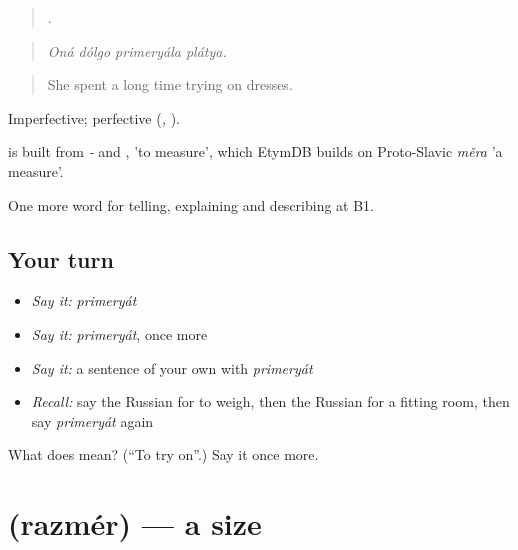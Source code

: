 \begin{quote}
   .
\end{quote}

\begin{quote}
\emph{Oná dólgo primeryála plátya.}
\end{quote}

\begin{quote}
She spent a long time trying on dresses.
\end{quote}

Imperfective; perfective \emph{} (\emph{, }).

\begin{cousinweb}
\emph{} is built from \emph{-} and \emph{}, \emph{} 'to measure', which EtymDB builds on Proto-Slavic \emph{měra} 'a measure'.
\end{cousinweb}

\begin{grammarlens}[title={What you've built}]
One more word for telling, explaining and describing at B1.
\end{grammarlens}

\subsection*{Your turn}
\begin{itemize}
\raggedright
  \item \emph{Say it:} \emph{primeryát}
  \item \emph{Say it:} \emph{primeryát}, once more
  \item \emph{Say it:} a sentence of your own with \emph{primeryát}
  \item \emph{Recall:} say the Russian for to weigh, then the Russian for a fitting room, then say \emph{primeryát} again
\end{itemize}

\begin{tcolorbox}[breakable,colback=teal!4,colframe=teal!35!black,title={Before you move on}]
What does  mean? (\textquotedblleft{}To try on\textquotedblright{}.) Say it once more.
\end{tcolorbox}
\section[\texorpdfstring{\ru{размер} (razmér)}{размер (razmér)}]{ (razmér) — a size}

